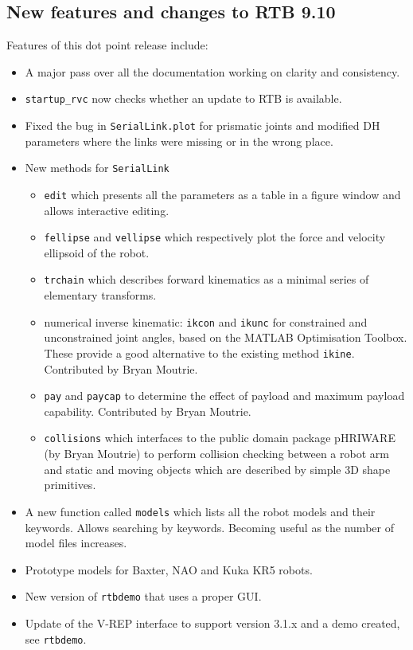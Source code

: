 \documentclass[a4paper]{report}
\begin{document}
\subsection{New features and changes to RTB 9.10}
Features of this dot point release include:
\begin{itemize}
\item A major pass over all the documentation working on clarity and consistency.
\item \texttt{startup\_rvc} now checks whether an update to RTB is available.
\item Fixed the bug in \texttt{SerialLink.plot} for prismatic joints and modified DH parameters where the links were missing or in the wrong place.
\item New methods for \texttt{SerialLink}
  \begin{itemize}
   \item \texttt{edit} which presents all the parameters as a table in a figure window and allows
interactive editing.
   \item \texttt{fellipse} and \texttt{vellipse} which respectively plot the force and velocity ellipsoid of the
robot.
\item  \texttt{trchain}  which describes forward kinematics as a minimal series of elementary transforms.
\item  numerical inverse kinematic: \texttt{ikcon} and \texttt{ikunc} for constrained and unconstrained joint angles, based on the  MATLAB Optimisation Toolbox.  These provide a good alternative to the existing method 
\texttt{ikine}.  Contributed by Bryan Moutrie.
\item  \texttt{pay} and \texttt{paycap}  to determine the effect of payload and maximum payload capability.  Contributed by Bryan Moutrie.
\item   \texttt{collisions} which interfaces to the public domain package pHRIWARE (by Bryan Moutrie) to perform collision checking between a robot arm and static and moving objects which are described by simple 3D shape primitives.
 \end{itemize}
\item A new function called \texttt{models} which lists all the robot models and their keywords.  Allows searching by keywords.  Becoming useful
as the number of model files increases.
\item Prototype models for Baxter, NAO and Kuka KR5 robots.
\item New version of \texttt{rtbdemo} that uses a proper GUI.
\item Update of the V-REP interface to support version 3.1.x and a demo created, see \texttt{rtbdemo}.

\end{itemize}
\end{document}
